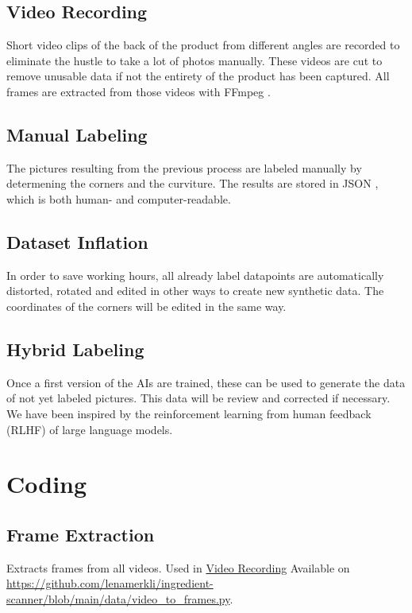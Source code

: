 \documentclass[a4paper,11pt]{report}
\begin{document}
            \subsection{Video Recording}
                \label{subsec:data:recording}
                Short video clips of the back of the product from different angles are recorded to eliminate the hustle to take a lot of photos manually. These videos are cut to remove unusable data if not the entirety of the product has been captured. All frames are extracted from those videos with FFmpeg \cite{ffmpeg} \cite{ffmpeg-python}.

            \subsection{Manual Labeling}
                The pictures resulting from the previous process are labeled manually by determening the corners and the curviture. The results are stored in JSON \cite{json}, which is both human- and computer-readable.

            \subsection{Dataset Inflation}
                \label{subsec:data:inflation}
                In order to save working hours, all already label datapoints are automatically distorted, rotated and edited in other ways to create new synthetic data. The coordinates of the corners will be edited in the same way.

            \subsection{Hybrid Labeling}
                Once a first version of the AIs are trained, these can be used to generate the data of not yet labeled pictures. This data will be review and corrected if necessary. We have been inspired by the reinforcement learning from human feedback (RLHF) \cite{rlhf1} \cite{rlhf2}  of large language models.

        \section{Coding}

            \subsection{Frame Extraction}
                Extracts frames from all videos. Used in \hyperref[subsec:data:recording]{Video Recording} Available on \url{https://github.com/lenamerkli/ingredient-scanner/blob/main/data/video_to_frames.py}.
\end{document}
